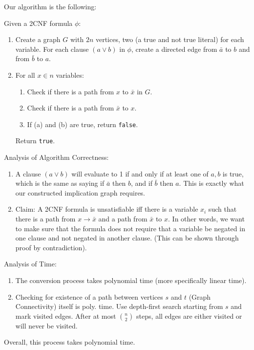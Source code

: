 \documentclass[11pt]{article}
\theoremstyle{definition}
\theoremstyle{remark}
\begin{document}
Our algorithm is the following:

Given a 2CNF formula $\phi$:
\begin{enumerate}
    \item Create a graph $G$ with $2n$ vertices, two (a true and not true literal) for each variable. For each clause $(a \vee b)$ in $\phi$, create a directed edge from $\bar{a}$ to $b$ and from $\bar{b}$ to $a$.
    \item For all $x \in n$ variables:
    \begin{enumerate}
        \item Check if there is a path from $x$ to $\bar{x}$ in $G$.
        \item Check if there is a path from $\bar{x}$ to $x.$
        \item If (a) and (b) are true, return \texttt{false}. 
    \end{enumerate}
    Return \texttt{true}.
\end{enumerate}

Analysis of Algorithm Correctness:
\begin{enumerate}
    \item A clause $(a \vee b)$ will evaluate to 1 if and only if at least one of $a, b$ is true, which is the same as saying if $\bar{a}$ then $b$, and if $\bar{b}$ then $a.$ This is exactly what our constructed implication graph requires.
    \item Claim: A 2CNF formula is unsatisfiable iff there is a variable $x_i$ such that there is a path from $x \rightarrow \bar{x}$ and a path from $\bar{x}$ to $x$. In other words, we want to make sure that the formula does not require that a variable be negated in one clause and not negated in another clause. (This can be shown through proof by contradiction).
\end{enumerate}

Analysis of Time:
\begin{enumerate}
\item The conversion process takes polynomial time (more specifically linear time).
\item Checking for existence of a path between vertices $s$ and $t$ (Graph Connectivity) 
	  itself is poly. time. Use depth-first search starting from $s$ and mark visited edges.
	  After at most $n \choose 2$ steps, all edges are either visited or will never be visited.
\end{enumerate}

Overall, this process takes polynomial time.
\end{document}

